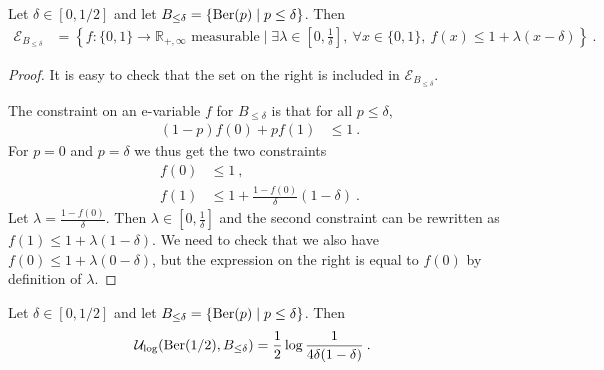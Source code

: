 \begin{lemma}\label{lem:eVarSet_bernoulli_le}
  \leanok
Let $\delta \in [0,1/2]$ and let $B_{\le \delta} = \{\operatorname{Ber}(p) \mid p \le \delta\}$.
Then
\begin{align*}
  \mathcal{E}_{B_{\le \delta}}
  &= \left\{f : \{0,1\} \to \mathbb{R}_{+, \infty} \text{ measurable} \mid \exists \lambda \in \left[0, \frac{1}{\delta}\right], \: \forall x \in \{0, 1\}, \: f(x) \le 1 + \lambda (x - \delta)\right\}
  \: .
\end{align*}
\end{lemma}

\begin{proof}\leanok
It is easy to check that the set on the right is included in $\mathcal{E}_{B_{\le \delta}}$.

The constraint on an e-variable $f$ for $B_{\le \delta}$ is that for all $p \le \delta$,
\begin{align*}
  (1 - p) f(0) + p f(1)
  &\le 1
  \: .
\end{align*}
For $p=0$ and $p=\delta$ we thus get the two constraints
\begin{align*}
  f(0)
  &\le 1
  \: , \\
  f(1)
  &\le 1 + \frac{1 - f(0)}{\delta}(1 - \delta)
  \: .
\end{align*}
Let $\lambda = \frac{1 - f(0)}{\delta}$.
Then $\lambda \in [0, \frac{1}{\delta}]$ and the second constraint can be rewritten as $f(1) \le 1 + \lambda (1 - \delta)$.
We need to check that we also have $f(0) \le 1 + \lambda (0 - \delta)$, but the expression on the right is equal to $f(0)$ by definition of $\lambda$.
\end{proof}


\begin{lemma}\label{lem:maxUtility_bernoulli_half_le}
  \leanok
Let $\delta \in [0,1/2]$ and let $B_{\le \delta} = \{\operatorname{Ber}(p) \mid p \le \delta\}$.
Then
\begin{align*}
  \mathcal{U}_{\log}(\operatorname{Ber}(1/2), B_{\le \delta})
  &= \frac{1}{2} \log \frac{1}{4 \delta (1 - \delta)}
  \: .
\end{align*}
\end{lemma}

